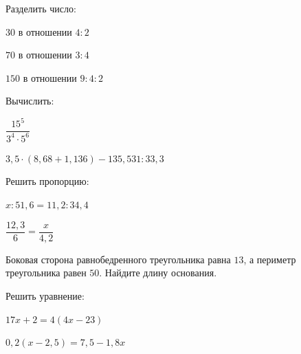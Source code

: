 \begin{homework}[number=1]
	\begin{listofex}
		\item Разделить число:
		\begin{enumcols}[itemcolumns=3]
			\item \( 30 \) в отношении \( 4:2 \)
			\item \( 70 \) в отношении \( 3:4 \)
			\item \( 150 \) в отношении \( 9:4:2 \)
		\end{enumcols}
		\item Вычислить:
		\begin{enumcols}[itemcolumns=3]
			\item \( \dfrac{15^5}{3^4\cdot5^6} \)
			\item \( 3,5\cdot(8,68+1,136)-135,531:33,3 \)
		\end{enumcols}
		\item Решить пропорцию:
		\begin{enumcols}[itemcolumns=2]
			\item \( x:51,6=11,2:34,4 \)
			\item \( \dfrac{12,3}{6}=\dfrac{x}{4,2} \)
		\end{enumcols}
		\item Боковая сторона равнобедренного треугольника равна \( 13 \), а периметр треугольника равен \( 50 \). Найдите длину основания.
		\item Решить уравнение:
		\begin{enumcols}[itemcolumns=2]
			\item \( 17x+2=4(4x-23) \)
			\item \( 0,2(x-2,5)=7,5-1,8x \)
		\end{enumcols}
	\end{listofex}
\end{homework}
%
%
